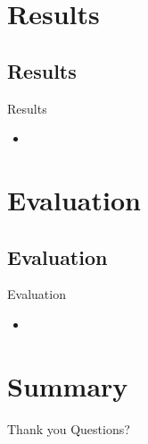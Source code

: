 \documentclass{beamer}
\begin{document}
\section{Results}
\subsection{Results}
\begin{frame}{Results}
\begin{itemize}
  \item 
\end{itemize}
\end{frame}

\section{Evaluation}
\subsection{Evaluation}
\begin{frame}{Evaluation}
\begin{itemize}
  \item 
\end{itemize}
\end{frame}

\section{Summary}
\begin{frame}{Thank you}
Questions?
\end{frame}
\end{document}
